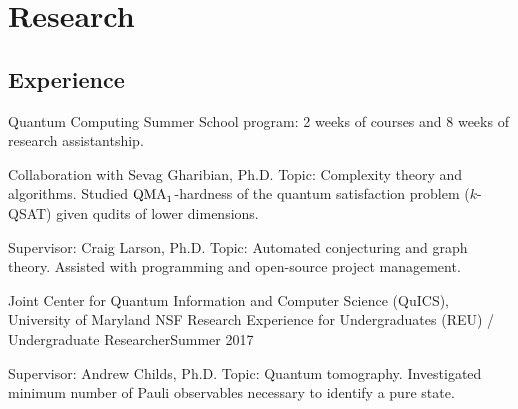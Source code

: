 \documentclass[11pt,letterpaper,serif]{moderncv}
\begin{document}
\section{Research}
\subsection{Experience}
{
	\begin{adjustwidth}{.25in}{}
		Quantum Computing Summer School program: 2 weeks of courses and 8 weeks of research assistantship.
	\end{adjustwidth}
}

{	
	\begin{adjustwidth}{.25in}{}
		Collaboration with Sevag Gharibian, Ph.D. \newline
		Topic: Complexity theory and algorithms. Studied $\textup{QMA}_{1}$-hardness of the quantum satisfaction problem ($k$-QSAT) given qudits of lower dimensions.
	\end{adjustwidth}
}

{	
	\begin{adjustwidth}{.25in}{}
		Supervisor: Craig Larson, Ph.D. \newline
		Topic: Automated conjecturing and graph theory. Assisted with programming and open-source project management.
	\end{adjustwidth}
}

\cventry{}
{\small Joint Center for Quantum Information and Computer Science (QuICS), University of Maryland}
{NSF Research Experience for Undergraduates (REU) / Undergraduate Researcher}{Summer 2017}{}
{	
	\begin{adjustwidth}{.25in}{}
		Supervisor: Andrew Childs, Ph.D. \newline
		Topic: Quantum tomography. Investigated minimum number of Pauli observables necessary to identify a pure state. %
	\end{adjustwidth}
}
\end{document}
